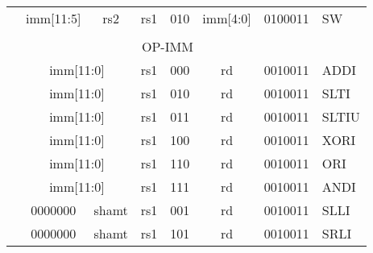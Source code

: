 \begin{table}[p]
\begin{small}
\begin{center}
\begin{tabular}{ccccccp{0.3in}p{0.3in}p{0.3in}cp{0.6in}l}
&
\multicolumn{4}{|c|}{imm[11:5]} &
\multicolumn{2}{c|}{rs2} &
\multicolumn{1}{c|}{rs1} &
\multicolumn{1}{c|}{010} &
\multicolumn{1}{c|}{imm[4:0]} &
\multicolumn{1}{c|}{0100011} & SW \\
\cline{2-11}
  
&
\multicolumn{10}{c}{} & \\

&
\multicolumn{10}{c}{OP-IMM} & \\

\cline{2-11}
 
&
\multicolumn{6}{|c|}{imm[11:0]} &
\multicolumn{1}{c|}{rs1} &
\multicolumn{1}{c|}{000} &
\multicolumn{1}{c|}{rd} &
\multicolumn{1}{c|}{0010011} & ADDI \\
\cline{2-11}
  

&
\multicolumn{6}{|c|}{imm[11:0]} &
\multicolumn{1}{c|}{rs1} &
\multicolumn{1}{c|}{010} &
\multicolumn{1}{c|}{rd} &
\multicolumn{1}{c|}{0010011} & SLTI \\
\cline{2-11}
  

&
\multicolumn{6}{|c|}{imm[11:0]} &
\multicolumn{1}{c|}{rs1} &
\multicolumn{1}{c|}{011} &
\multicolumn{1}{c|}{rd} &
\multicolumn{1}{c|}{0010011} & SLTIU \\
\cline{2-11}
  

&
\multicolumn{6}{|c|}{imm[11:0]} &
\multicolumn{1}{c|}{rs1} &
\multicolumn{1}{c|}{100} &
\multicolumn{1}{c|}{rd} &
\multicolumn{1}{c|}{0010011} & XORI \\
\cline{2-11}
  

&
\multicolumn{6}{|c|}{imm[11:0]} &
\multicolumn{1}{c|}{rs1} &
\multicolumn{1}{c|}{110} &
\multicolumn{1}{c|}{rd} &
\multicolumn{1}{c|}{0010011} & ORI \\
\cline{2-11}
  

&
\multicolumn{6}{|c|}{imm[11:0]} &
\multicolumn{1}{c|}{rs1} &
\multicolumn{1}{c|}{111} &
\multicolumn{1}{c|}{rd} &
\multicolumn{1}{c|}{0010011} & ANDI \\
\cline{2-11}
  

&
\multicolumn{4}{|c|}{0000000} &
\multicolumn{2}{c|}{shamt} &
\multicolumn{1}{c|}{rs1} &
\multicolumn{1}{c|}{001} &
\multicolumn{1}{c|}{rd} &
\multicolumn{1}{c|}{0010011} & SLLI \\
\cline{2-11}
  

&
\multicolumn{4}{|c|}{0000000} &
\multicolumn{2}{c|}{shamt} &
\multicolumn{1}{c|}{rs1} &
\multicolumn{1}{c|}{101} &
\multicolumn{1}{c|}{rd} &
\multicolumn{1}{c|}{0010011} & SRLI \\
\cline{2-11}
  


\end{tabular}
\end{center}
\end{small}
\end{table}
